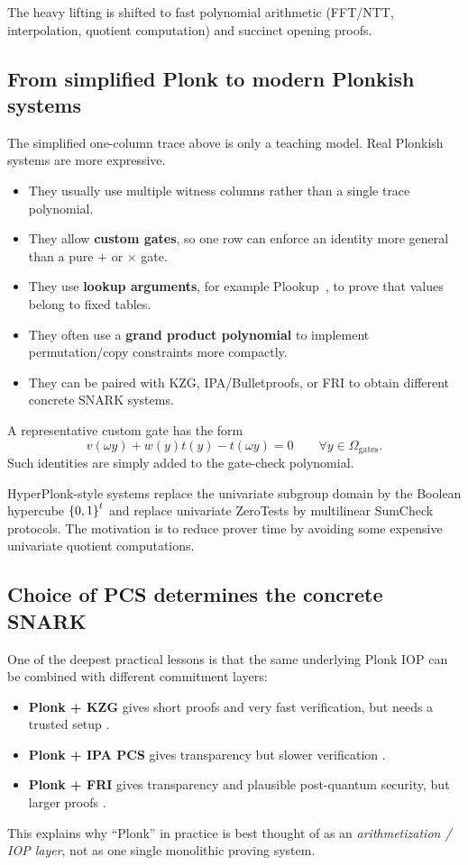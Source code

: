 The heavy lifting is shifted to fast polynomial arithmetic (FFT/NTT, interpolation, quotient computation) and succinct opening proofs.

\subsection{From simplified Plonk to modern Plonkish systems}

The simplified one-column trace above is only a teaching model. Real Plonkish systems are more expressive.

\begin{itemize}[leftmargin=2em]
    \item They usually use multiple witness columns rather than a single trace polynomial.
    \item They allow \textbf{custom gates}, so one row can enforce an identity more general than a pure $+$ or $\times$ gate.
    \item They use \textbf{lookup arguments}, for example Plookup~\cite{GabizonWilliamson2020Plookup}, to prove that values belong to fixed tables.
    \item They often use a \textbf{grand product polynomial} to implement permutation/copy constraints more compactly.
    \item They can be paired with KZG, IPA/Bulletproofs, or FRI to obtain different concrete SNARK systems.
\end{itemize}

A representative custom gate has the form
\[
    v(\omega y)+w(y)t(y)-t(\omega y)=0
    \qquad\forall y\in\Omega_{\mathrm{gates}}.
\]
Such identities are simply added to the gate-check polynomial.

HyperPlonk-style systems replace the univariate subgroup domain by the Boolean hypercube $\left\{0,1\right\}^t$ and replace univariate ZeroTests by multilinear SumCheck protocols. The motivation is to reduce prover time by avoiding some expensive univariate quotient computations.

\subsection{Choice of PCS determines the concrete SNARK}

One of the deepest practical lessons is that the same underlying Plonk IOP can be combined with different commitment layers:
\begin{itemize}[leftmargin=2em]
    \item \textbf{Plonk + KZG} gives short proofs and very fast verification, but needs a trusted setup \cite{KateZaveruchaGoldberg2010,GabizonWilliamsonCiobotaru2019}.
    \item \textbf{Plonk + IPA PCS} gives transparency but slower verification \cite{Bulletproofs2018}.
    \item \textbf{Plonk + FRI} gives transparency and plausible post-quantum security, but larger proofs \cite{BenSassonBentovHoreshRiabzev2018FRI}.
\end{itemize}

This explains why ``Plonk'' in practice is best thought of as an \emph{arithmetization / IOP layer}, not as one single monolithic proving system.


